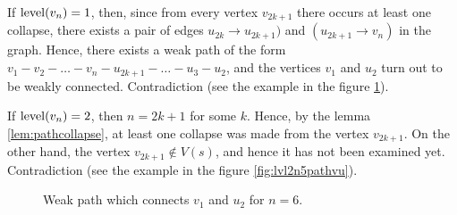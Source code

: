 If $ \operatorname{level} (v_{n}) = 1 $, then, since from every vertex $ v_{2k + 1} $ there occurs at least one collapse, there exists a pair of edges $ u_{2k} \to u_{2k + 1} ) $ and $ (u_{2k + 1} \to v_n) $ in the graph. Hence, there exists a weak path of the form $ v_1 - v_2 - \ldots - v_n - u_{2k + 1} - \ldots - u_3 - u_2 $, and the vertices $ v_1 $ and $ u_2 $ turn out to be weakly connected. Contradiction (see the example in the figure \ref {fig:lvl2n6pathvu}).

If $ \operatorname{level} (v_{n}) = 2 $, then $ n = 2k + 1 $ for some $ k $. Hence, by the lemma \ref{lem:pathcollapse}, at least one collapse was made from the vertex $ v_{2k + 1} $. On the other hand, the vertex $ v_{2k + 1} \notin V (s) $, and hence it has not been examined yet. Contradiction (see the example in the figure \ref{fig:lvl2n5pathvu}).

\begin{figure}[ht]
\begin{center}

\end{center}

\caption{Weak path which connects $v_1$ and $u_2$ for $n=6$.}\label{fig:lvl2n6pathvu}
\end{figure}

